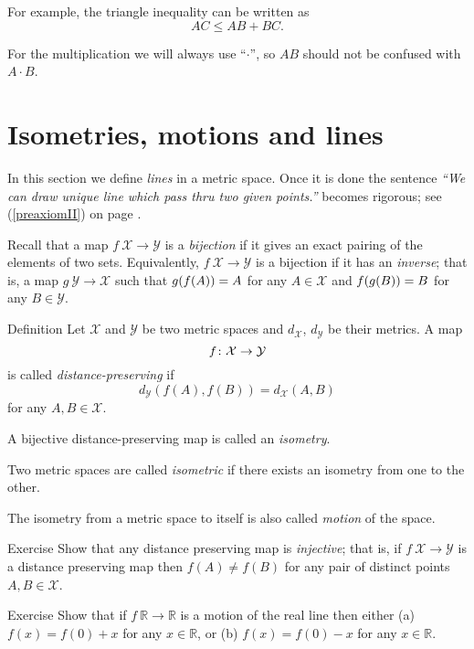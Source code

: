 For example, the triangle inequality can be written as 
$$AC\le AB+BC.$$

For the multiplication we will always use ``$\cdot$'',
so $AB$ should not be confused with $A\cdot B$.

\section*{Isometries, motions and lines}

In this section we define {}\emph{lines} in a metric space.
Once it is done the sentence  {}\emph{``We can draw unique line which pass thru two given points.''} becomes rigorous; see (\ref{preaxiomII}) on page \pageref{preaxiomII}. 

Recall that a map $f\:\mathcal{X}\to\mathcal{Y}$
is a \emph{bijection} 
if it gives an exact pairing of the elements of two sets.
Equivalently, $f\:\mathcal{X}\to\mathcal{Y}$ is a bijection if it has an \emph{inverse};
that is, a map $g\:\mathcal{Y}\to\mathcal{X}$
such that 
$g(f(A))\z=A$   for any $A\in\mathcal{X}$
and
$f(g(B))\z=B$ for any $B\in\mathcal{Y}$. 

\begin{thm}{Definition}\label{def:isom}
Let $\mathcal X$ and $\mathcal Y$ be two metric spaces and $d_{\mathcal X}$, $d_{\mathcal Y}$ be their metrics. 
A map 
$$f\:\mathcal X \z\to \mathcal Y$$ 
is
called \emph{distance-preserving} if 
$$d_{\mathcal Y}(f(A), f(B))
 = d_{\mathcal X}(A,B)$$
for any $A,B\in {\mathcal X}$.

A bijective distance-preserving map is called an \emph{isometry}. 

Two metric spaces are called
\emph{isometric} if there exists an isometry from one to the other.

The isometry from a metric space to itself 
is also called \emph{motion} of the space.
\end{thm}

\begin{thm}{Exercise}\label{ex:dist-preserv=>injective}
Show that any distance preserving map  is \emph{injective};
that is, if $f\:\mathcal X\to\mathcal Y$ is a distance preserving map then
$f(A)\ne f(B)$
for any pair of distinct points $A,  B\in \mathcal X$.
\end{thm}

\begin{thm}{Exercise}\label{ex:motion-of-R}
Show that if $f\:\mathbb{R}\to\mathbb{R}$ is a motion of the real line 
then either (a)
$f(x)=f(0)+x$ for any $x\in \mathbb{R}$,  
or (b)
$f(x)=f(0)-x$ for any $x\in \mathbb{R}$. 

\end{thm}

